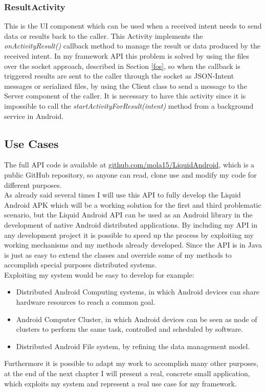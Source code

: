 \subsubsection{ResultActivity}
This is the UI component which can be used when a received intent needs to send data or results back to the caller. This Activity implements the \textit{onActivityResult()} callback method to manage the result or data produced by the received intent. In my framework API this problem is solved by using the files over the socket approach, described in Section \ref{fos}, so when the callback is triggered results are sent to the caller through the socket as JSON-Intent messages or serialized files, by using the Client class to send a message to the Server component of the caller. It is necessary to have this activity since it is impossible to call the \textit{startActivityForResult(intent)} method from a background service in Android.

\subsection{Use Cases}
The full API code is available at \href{https://github.com/mola15/LiquidAndroid}{github.com/mola15/LiquidAndroid}, which is a public GitHub repository, so anyone can read, clone use and modify my code for different purposes.\\
As already said several times I will use this API to fully develop the Liquid Android APK which will be a working solution for the first and third problematic scenario, but the Liquid Android API can be used as an Android library in the development of native Android distributed applications. By including my API in any development project it is possible to speed up the process by exploiting my working mechanisms and my methods already developed. Since the API is in Java is just as easy to extend the classes and override some of my methods to accomplish special purposes distributed systems.\\
Exploiting my system would be easy to develop for example:
\begin{itemize}
	\item Distributed Android Computing systems, in which Android devices can share hardware resources to reach a common goal.
	\item Android Computer Cluster, in which Android devices can be seen as node of clusters to perform the same task, controlled and scheduled by software.
	\item Distributed Android File system, by refining the data management model.
\end{itemize}
Furthermore it is possible to adapt my work to accomplish many other purposes, at the end of the next chapter I will present a real, concrete small application, which exploits my system and represent a real use case for my framework.

%

